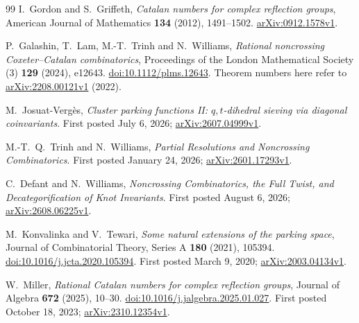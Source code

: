 \documentclass[11pt]{article}
\begin{document}
\begin{thebibliography}{99}
I.~Gordon and S.~Griffeth,
\emph{Catalan numbers for complex reflection groups},
American Journal of Mathematics \textbf{134} (2012), 1491--1502.
\href{https://arxiv.org/abs/0912.1578v1}{arXiv:0912.1578v1}.

P.~Galashin, T.~Lam, M.-T.~Trinh and N.~Williams,
\emph{Rational noncrossing Coxeter--Catalan combinatorics},
Proceedings of the London Mathematical Society (3) \textbf{129} (2024), e12643.
\href{https://doi.org/10.1112/plms.12643}{doi:10.1112/plms.12643}.
Theorem numbers here refer to
\href{https://arxiv.org/abs/2208.00121v1}{arXiv:2208.00121v1} (2022).

M.~Josuat-Verg\`es,
\emph{Cluster parking functions II: $q,t$-dihedral sieving via diagonal coinvariants}.
First posted July 6, 2026;
\href{https://arxiv.org/abs/2607.04999v1}{arXiv:2607.04999v1}.

M.-T.~Q.~Trinh and N.~Williams,
\emph{Partial Resolutions and Noncrossing Combinatorics}.
First posted January 24, 2026;
\href{https://arxiv.org/abs/2601.17293v1}{arXiv:2601.17293v1}.

C.~Defant and N.~Williams,
\emph{Noncrossing Combinatorics, the Full Twist, and Decategorification of Knot Invariants}.
First posted August 6, 2026;
\href{https://arxiv.org/abs/2608.06225v1}{arXiv:2608.06225v1}.

M.~Konvalinka and V.~Tewari,
\emph{Some natural extensions of the parking space},
Journal of Combinatorial Theory, Series A \textbf{180} (2021), 105394.
\href{https://doi.org/10.1016/j.jcta.2020.105394}{doi:10.1016/j.jcta.2020.105394}.
First posted March 9, 2020;
\href{https://arxiv.org/abs/2003.04134v1}{arXiv:2003.04134v1}.

W.~Miller, \emph{Rational Catalan numbers for complex reflection groups},
Journal of Algebra \textbf{672} (2025), 10--30.
\href{https://doi.org/10.1016/j.jalgebra.2025.01.027}{doi:10.1016/j.jalgebra.2025.01.027}.
First posted October 18, 2023;
\href{https://arxiv.org/abs/2310.12354v1}{arXiv:2310.12354v1}.

\end{thebibliography}
\end{document}
